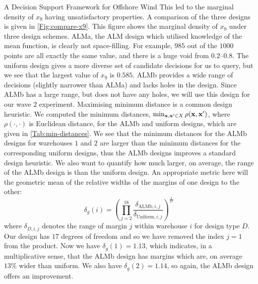 \begin{chapter}{A Decision Support Framework for Offshore Wind \label{Ch:ds-for-ow}}
This led to the marginal density of $x_9$ having unsatisfactory properties. A comparison of the three designs is given in \cref{Fig:compare-x9}. This figure shows the marginal density of $x_9$ under three design schemes. ALMa, the ALM design which utilised knowledge of the mean function, is clearly not space-filling. For example, $985$ out of the $1000$ points are all exactly the same value, and there is a huge void from $0.2$--$0.8$. The uniform design gives a more diverse set of candidate decisions for us to query, but we see that the largest value of $x_9$ is $0.585$. ALMb provides a wide range of decisions (slightly narrower than ALMa) and lacks holes in the design. Since ALMb has a large range, but does not have any holes, we will use this design for our wave $2$ experiment. Maximising minimum distance is a common design heuristic. We computed the minimum distances, $\min_{\mathbf{x}, \mathbf{x}' \in X} \rho (\mathbf{x}, \mathbf{x}')$, where $\rho(\cdot, \cdot)$ is Euclidean distance, for the ALMb and uniform designs, which are given in \cref{Tab:min-distances}. We see that the minimum distances for the ALMb designs for warehouses $1$ and $2$ are larger than the minimum distances for the corresponding uniform designs, thus the ALMb designs improves a standard design heuristic. We also want to quantify how much larger, on average, the range of the ALMb design is than the uniform design. An appropriate metric here will the geometric mean of the relative widths of the margins of one design to the other:
\begin{equation}
 \delta_g (i) = \left( \prod_{j=2}^{18} \frac{\delta_{\text{ALMb},i,j}}{\delta_{\text{Uniform},i,j}} \right)^{\frac{1}{17}}
\end{equation}
where $\delta_{D, i, j}$ denotes the range of margin $j$ within warehouse $i$ for design type $D$. Our design has $17$ degrees of freedom and so we have removed the index $j=1$ from the product. Now we have $\delta_g(1) = 1.13$, which indicates, in a multiplicative sense, that the ALMb design has margins which are, on average $13\%$ wider than uniform. We also have $\delta_g(2) = 1.14$, so again, the ALMb design offers an improvement.


\end{chapter}
